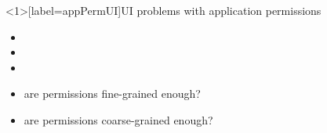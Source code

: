 
\begin{frame}<1>[label=appPermUI]{UI problems with application permissions}
    \begin{itemize}
    \item {}
    \item {}
    \item {}
    \item are permissions fine-grained enough?
    \item are permissions coarse-grained enough?
    \end{itemize}
\end{frame}
